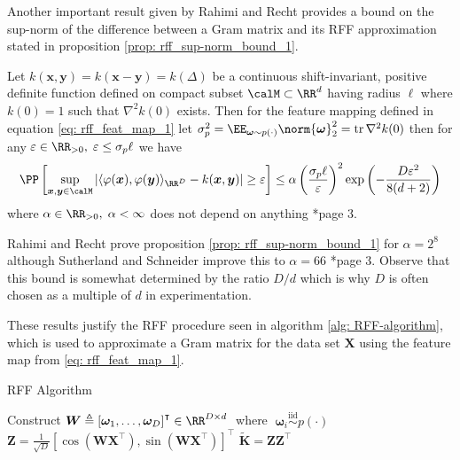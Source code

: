Another important result given by Rahimi and Recht provides a bound on the sup-norm of the difference between a Gram matrix and its RFF approximation stated in proposition \ref{prop: rff_sup-norm_bound_1}.

\begin{prop} \label{prop: rff_sup-norm_bound_1}
    Let $k(\bm{x} , \bm{y}) = k(\bm{x} - \bm{y}) = k( \Delta)$ be a continuous shift-invariant, positive definite function defined on compact subset $\calM \subset \RR^d$ having radius $\ell$ where $k(0) = 1$ such that $\nabla^2 k(0)$ exists. Then for the feature mapping defined in equation \ref{eq: rff_feat_map_1} let $\sigma_p^2 = \EE_{\bm{\omega} \sim p(\cdot)} \norm{\bm{\omega}}^2_2 = \operatorname{tr} \nabla^2 k(0)$ then for any $\varepsilon \in \RR_{>0}, \; \varepsilon \leq \sigma_p \ell$ we have
    \[
        \PP \left[ \sup_{\bm{x},\bm{y} \in \calM} \left| \langle \varphi (\bm{x}) , \varphi (\bm{y}) \rangle_{\RR^D} - k (\bm{x},\bm{y}) \right| \geq \varepsilon \right] \leq \alpha \left( \frac{\sigma_p \ell}{\varepsilon} \right)^2 \exp \left( - \frac{D \varepsilon^2}{8(d+2)} \right)
    \]
    where $\alpha \in \RR_{>0}, \; \alpha < \infty$ does not depend on anything \cite{NIPS2007_013a006f}*{page 3}.
\end{prop}

Rahimi and Recht prove proposition \ref{prop: rff_sup-norm_bound_1} for $\alpha = 2^8$ although Sutherland and Schneider improve this to $\alpha = 66$ \cite{sutherland2015error}*{page 3}. Observe that this bound is somewhat determined by the ratio $D/d$ which is why $D$ is often chosen as a multiple of $d$ in experimentation.

These results justify the RFF procedure seen in algorithm \ref{alg: RFF-algorithm}, which is used to approximate a Gram matrix for the data set $\bm{X}$ using the feature map from \ref{eq: rff_feat_map_1}.

{\centering
\begin{minipage}{.85\linewidth}
    \begin{algorithm}[H]
        \caption{RFF Algorithm}
        \label{alg: RFF-algorithm}
        \SetAlgoLined
        \DontPrintSemicolon

        \BlankLine
        Construct $\bm{W} \triangleq \left[ \bm{\omega}_1 ,\ldots , \bm{\omega}_D \right]^{\intercal} \in \RR^{D \times d} \;$ where $\; \bm{\omega}_i \stackrel{\text{iid}}{\sim} p(\cdot)$\;
        $\bm{Z} = \frac{1}{\sqrt{D}} \left[ \cos \left( \bm{W} \bm{X}^{\intercal} \right), \sin \left( \bm{W} \bm{X}^{\intercal} \right) \right]^{\intercal}$\;
        $\bm{\widetilde{K}} = \bm{Z}\bm{Z}^{\intercal}$\;
        \BlankLine
    \end{algorithm}
\end{minipage}
\par
}

